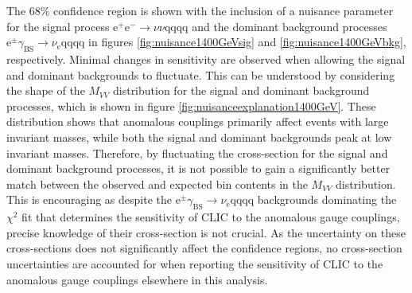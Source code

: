 The 68\% confidence region is shown with the inclusion of a nuisance parameter for the signal process $\text{e}^{+}\text{e}^{-} \rightarrow \nu{\nu}\text{qqqq}$ and the dominant background processes $\text{e}^{\pm}\gamma_{\text{BS}} \rightarrow \nu_{\text{e}}\text{qqqq}$ in figures \ref{fig:nuisance1400GeVsig} and \ref{fig:nuisance1400GeVbkg}{,} respectively.  Minimal changes in sensitivity are observed when allowing the signal and dominant backgrounds to fluctuate.  This can be understood by considering the shape of the $M_{VV}$ distribution for the signal and dominant background processes, which is shown in figure \ref{fig:nuisanceexplanation1400GeV}.  These distribution shows that anomalous couplings primarily affect events with large invariant masses, while both the signal and dominant backgrounds peak at low invariant masses.  Therefore, by fluctuating the cross-section for the signal and dominant background processes, it is not possible to gain a significantly better match between the observed and expected bin contents in the $M_{VV}$ distribution.  This is encouraging as despite the $\text{e}^{\pm}\gamma_{\text{BS}} \rightarrow \nu_{\text{e}}\text{qqqq}$ backgrounds dominating the $\chi^{2}$ fit that determines the sensitivity of CLIC to the anomalous gauge couplings, precise knowledge of their cross-section is not crucial.  As the uncertainty on these cross-sections does not significantly {affect} the confidence regions, no cross-section uncertainties are accounted for when reporting the sensitivity of CLIC to the anomalous gauge couplings elsewhere in this analysis.   

